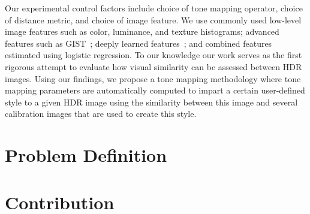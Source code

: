 Our experimental control factors include choice of tone mapping operator, choice of distance metric, and choice of image feature. We use commonly used low-level image features such as color, luminance, and texture histograms; advanced features such as GIST~\cite{oliva2001modeling};  deeply learned features~\cite{simonyan2014very}; and combined features estimated using logistic regression. To our knowledge our work serves as the first rigorous attempt to evaluate how visual similarity can be assessed between HDR images. Using our findings, we propose a tone mapping methodology where tone mapping parameters are automatically computed to impart a certain user-defined style to a given HDR image using the similarity between this image and several calibration images that are used to create this style.
\section{ Problem Definition}


\section{Contribution}






